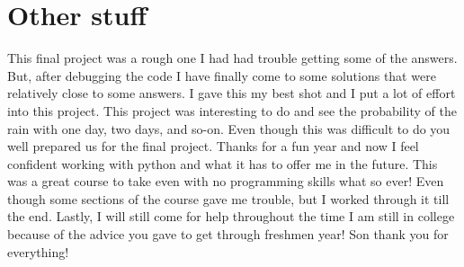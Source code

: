 \documentclass[twocolumn]{revtex4}
\begin{document}
\section{Other stuff}

This final project was a rough one I had had trouble getting some of the answers.  But, after debugging the code I have finally come to some solutions that were relatively close to some answers.  I gave this my best shot and I put a lot of effort into this project.  This project was interesting to do and see the probability of the rain with one day, two days, and so-on.  Even though this was difficult to do you well prepared us for the final project.  Thanks for a fun year and now I feel confident working with python and what it has to offer me in the future.  This was a great course to take even with no programming skills what so ever!  Even though some sections of the course gave me trouble, but I worked through it till the end.  Lastly, I will still come for help throughout the time I am still in college because of the advice you gave to get through freshmen year!  Son thank you for everything!


\end{document}
